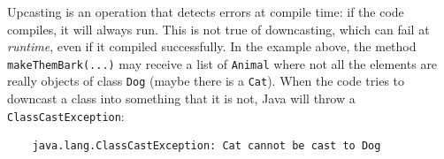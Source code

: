 Upcasting is an operation that detects errors at compile time: if the
code compiles, it will always run. This is not true of downcasting, which can
fail at \emph{runtime}, even if it compiled successfully. In the
example above, the method \verb+makeThemBark(...)+ may receive a list
of \verb+Animal+ where not all the elements are really objects of
class \verb+Dog+ (maybe there is a \verb+Cat+). When the code tries to
downcast a class into something that it is not, Java will throw a
\verb+ClassCastException+: 

\begin{verbatim}
    java.lang.ClassCastException: Cat cannot be cast to Dog
\end{verbatim}


